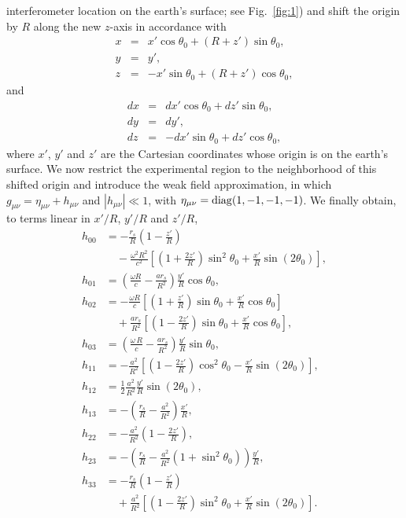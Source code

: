 \documentclass[twocolumn,reprint,amsmath,amssymb]{revtex4}
\def\BEqA{\begin{eqnarray}}
\def\EEqA{\end{eqnarray}}
\def\m{\mu}
\def\n{\nu}
\begin{document}
interferometer location on the earth's surface; see Fig.\ \ref{fig:1})
and shift the origin by $R$ along the new $z$-axis 
in accordance with
\BEqA
x &=& x'\cos{\theta_0} + (R+z')\sin{\theta_0},
\\
y &=& y',
\\
z &=& -x'\sin{\theta_0} + (R+z')\cos{\theta_0},
\EEqA
and
\BEqA
dx &=& dx'\cos{\theta_0} + dz'\sin{\theta_0},
\\
dy &=& dy',
\\
dz &=& -dx'\sin{\theta_0} + dz'\cos{\theta_0},
\EEqA
where $x'$, $y'$ and $z'$ are the Cartesian coordinates whose origin is on the earth's
surface. We now restrict the experimental region to the neighborhood of this shifted
origin and introduce the weak field approximation, in which
$g_{\m\n} = \eta_{\m\n}+h_{\m\n}$ and $|h_{\mu\nu}| \ll 1$, with  
$\eta_{\m\n}={\rm diag}(1,-1,-1,-1)$. We finally obtain, to
terms linear in $x'/R$, $y'/R$ and $z'/R$,
\begin{align}
\label{eq:h_mn}
h_{00}&= 
-\frac{{r_s} }{R}  \left(1 - \frac{z'}{R}\right)  
\nonumber \\
& \quad
- \frac{{\omega}^2 R^2}{c^2} 
\left[
\left(1 + \frac{2z'}{R}\right)\sin^2\theta_0 + \frac{x'}{R} \sin \left(2\theta_0\right)
\right],
\\
h_{01}&= 
\left(\frac{\omega R}{c} - \frac{a {r_s}}{R^2}\right)\frac{y'}{R}\cos\theta_0,
\\
h_{02}&= 
- \frac{\omega R }{c}
\left[
\left(1  + \frac{z'}{R}\right) \sin\theta_0
+ \frac{x'}{R}\cos\theta_0  
\right]
\nonumber \\
& \quad
+ \frac{a {r_s}}{R^2}
\left[
\left(1 - \frac{2 z'}{R}\right)\sin\theta_0 
+\frac{x'}{R} \cos\theta_0 
\right],
\\
h_{03}&= 
\left(\frac{\omega\, R}{c} - \frac{a {r_s}}{R^2}\right)\frac{y'}{R}\sin\theta_0,
\\
h_{11}&= 
-\frac{a^2}{R^2} 
\left[
\left(1-\frac{2z'}{R} \right)\cos^2\theta_0 - \frac{x'}{R}\sin\left(2 \theta_0\right)
\right],
\\
h_{12}&= 
\frac{1}{2}\frac{a^2}{R^2}\frac{y'}{R}\sin\left(2\theta_0\right),
\\
h_{13}&= 
-\left(\frac{r_s}{R}-\frac{a^2}{R^2}\right)\frac{x'}{R},
\\
h_{22}&= 
- \frac{a^2}{R^2}\left(1 - \frac{2 z'}{R}\right),
\\
h_{23}&= 
- \left(
\frac{{r_s}}{R} -\frac{a^2}{R^2} (1 +  \sin^2\theta_0) 
\right)\frac{y'}{R},
\\
h_{33}&= 
- \frac{{r_s} }{R}\left(1- \frac{z'}{R}\right)
\nonumber \\
& \quad
+\frac{a^2}{R^2} 
\left[
\left(1 - \frac{2z'}{R}\right)\sin^2\theta_0 + \frac{x'}{R} \sin \left(2\theta_0\right)
\right] .
\end{align}
\end{document}
